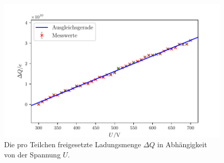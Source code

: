 \begin{figure}
	\centering
	\includegraphics[width=\linewidth-50pt,height=\textheight-50pt,keepaspectratio]{content/images/Graph2.pdf}
	\caption{Die pro Teilchen freigesetzte Ladungsmenge $\Delta Q$ in Abhängigkeit von der Spannung $U$.}
	\label{fig:Graph2}
\end{figure}